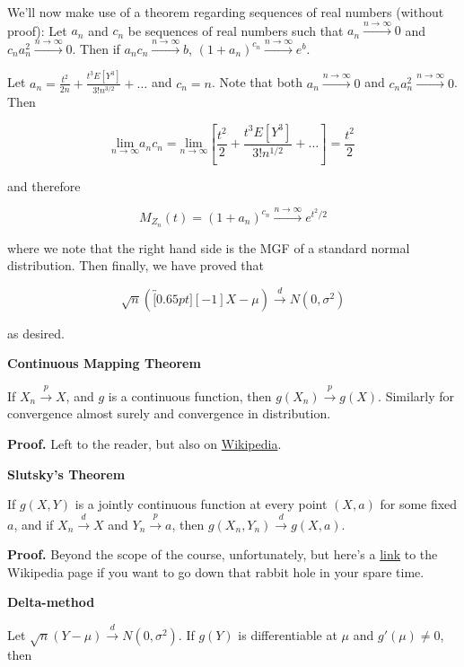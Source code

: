 \documentclass[
  letterpaper,
  DIV=11,
  numbers=noendperiod]{scrreprt}
\begin{document}
We'll now make use of a theorem regarding sequences of real numbers
(without proof): Let \(a_n\) and \(c_n\) be sequences of real numbers
such that \(a_n \overset{n \to \infty}{\to} 0\) and
\(c_na_n^2 \overset{n \to \infty}{\to} 0\). Then if
\(a_nc_n \overset{n \to \infty}{\to} b\),
\((1 + a_n)^{c_n} \overset{n \to \infty}{\to} e^b\).

Let \(a_n = \frac{t^2}{2n} + \frac{t^3E[Y^3]}{3!n^{3/2}} + \dots\) and
\(c_n = n\). Note that both \(a_n \overset{n \to \infty}{\to} 0\) and
\(c_na_n^2 \overset{n \to \infty}{\to} 0\). Then

\[
\underset{n \to \infty}{\text{lim}} a_n c_n = \underset{n \to \infty}{\text{lim}} \left[ \frac{t^2}{2} + \frac{t^3E[Y^3]}{3!n^{1/2}} + \dots\right] = \frac{t^2}{2}
\]

and therefore

\[
M_{Z_n}(t) = (1 + a_n)^{c_n} \overset{n \to \infty}{\to} e^{t^2/2}
\]

where we note that the right hand side is the MGF of a standard normal
distribution. Then finally, we have proved that

\[
\sqrt{n}(\overbracket[0.65pt][-1]{X} - \mu) \overset{d}{\to} N(0, \sigma^2)
\]

as desired.

\textbf{Continuous Mapping Theorem}

If \(X_n \overset{p}{\to} X\), and \(g\) is a continuous function, then
\(g(X_n) \overset{p}{\to} g(X)\). Similarly for convergence almost
surely and convergence in distribution.

\textbf{Proof.} Left to the reader, but also on
\href{https://en.wikipedia.org/wiki/Continuous_mapping_theorem\#Proof}{Wikipedia}.

\textbf{Slutsky's Theorem}

If \(g(X, Y)\) is a jointly continuous function at every point
\((X, a)\) for some fixed \(a\), and if \(X_n \overset{d}{\to} X\) and
\(Y_n \overset{p}{\to} a\), then
\(g(X_n, Y_n) \overset{d}{\to} g(X, a)\).

\textbf{Proof.} Beyond the scope of the course, unfortunately, but
here's a
\href{https://en.wikipedia.org/wiki/Slutsky\%27s_theorem\#Proof}{link}
to the Wikipedia page if you want to go down that rabbit hole in your
spare time.

\textbf{Delta-method}

Let \(\sqrt{n} (Y - \mu) \overset{d}{\to} N(0, \sigma^2)\). If \(g(Y)\)
is differentiable at \(\mu\) and \(g'(\mu) \neq 0\), then
\end{document}
